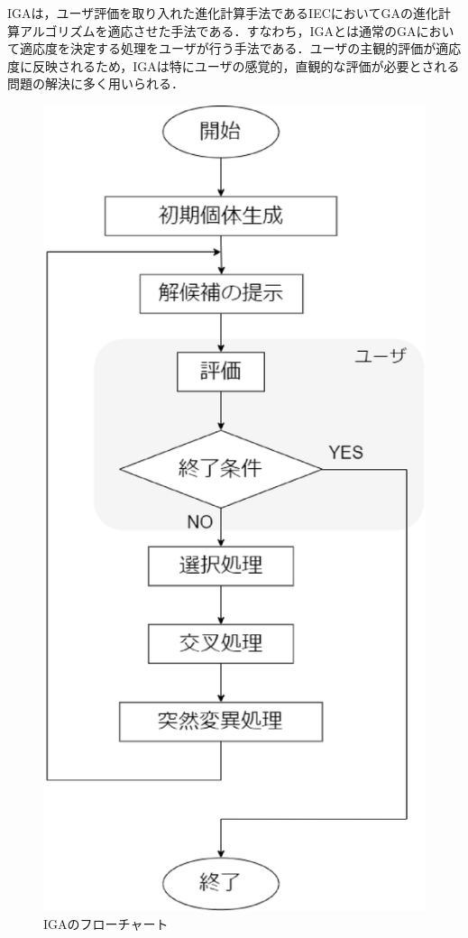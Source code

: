 IGAは，ユーザ評価を取り入れた進化計算手法であるIECにおいてGAの進化計算アルゴリズムを適応させた手法である．すなわち，IGAとは通常のGAにおいて適応度を決定する処理をユーザが行う手法である．ユーザの主観的評価が適応度に反映されるため，IGAは特にユーザの感覚的，直観的な評価が必要とされる問題の解決に多く用いられる．
\begin{figure}[p]
\begin{center}

\vspace{1.5cm}
\includegraphics[scale=0.6]{figure/chapter2/IGAflow.eps}
\caption{IGAのフローチャート}
\label{対話型遺伝的アルゴリズムのフローチャート}

\end{center}
\end{figure}



